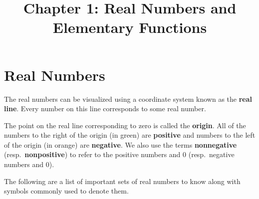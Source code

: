 \documentclass{article}
\title{Chapter 1: Real Numbers and Elementary Functions}
\author{}
\date{}
\begin{document}
\maketitle

\section{Real Numbers}

The real numbers can be visualized using a coordinate system known as the \textbf{real line}. Every number on this line corresponds to some real number.

\begin{center}
\end{center}

The point on the real line corresponding to zero is called the \textbf{origin}. All of the numbers to the right of the origin (in green) are \textbf{positive} and numbers to the left of the origin (in orange) are \textbf{negative}. We also use the terms \textbf{nonnegative} (resp.~\textbf{nonpositive}) to refer to the positive numbers and $0$ (resp.~negative numbers and 0).

\vspace{5pt}
The following are a list of important sets of real numbers to know along with symbols commonly used to denote them.
\end{document}
